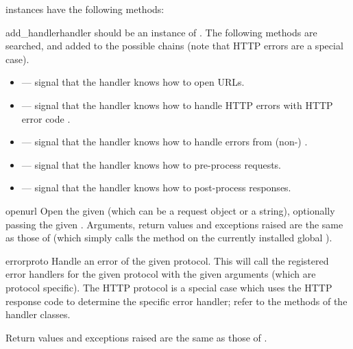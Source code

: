  instances have the following methods:

\begin{methoddesc}[OpenerDirector]{add_handler}{handler}
 should be an instance of .  The
following methods are searched, and added to the possible chains (note
that HTTP errors are a special case).

\begin{itemize}
  \item {} ---
    signal that the handler knows how to open  URLs.
  \item {} ---
    signal that the handler knows how to handle HTTP errors with HTTP
    error code .
  \item {} ---
    signal that the handler knows how to handle errors from
    (non-) .
  \item {} ---
    signal that the handler knows how to pre-process 
    requests.
  \item {} ---
    signal that the handler knows how to post-process 
    responses.
\end{itemize}
\end{methoddesc}

\begin{methoddesc}[OpenerDirector]{open}{url}
Open the given  (which can be a request object or a string),
optionally passing the given .
Arguments, return values and exceptions raised are the same as those
of  (which simply calls the  method
on the currently installed global ).
\end{methoddesc}

\begin{methoddesc}[OpenerDirector]{error}{proto}
Handle an error of the given protocol.  This will call the registered
error handlers for the given protocol with the given arguments (which
are protocol specific).  The HTTP protocol is a special case which
uses the HTTP response code to determine the specific error handler;
refer to the  methods of the handler classes.

Return values and exceptions raised are the same as those
of .
\end{methoddesc}

